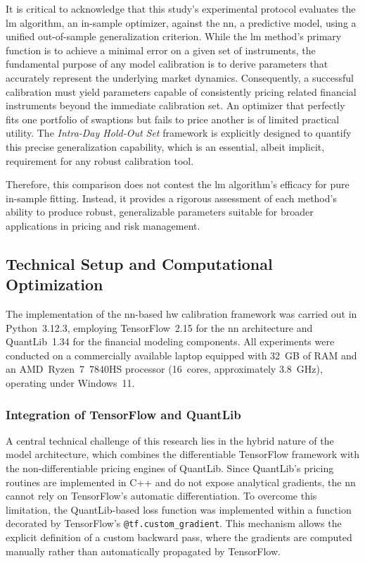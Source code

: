 It is critical to acknowledge that this study's experimental protocol evaluates the \ac{lm} algorithm, an in-sample optimizer, against the \ac{nn}, a predictive model, using a unified out-of-sample generalization criterion. While the \ac{lm} method's primary function is to achieve a minimal error on a given set of instruments, the fundamental purpose of any model calibration is to derive parameters that accurately represent the underlying market dynamics. Consequently, a successful calibration must yield parameters capable of consistently pricing related financial instruments beyond the immediate calibration set. An optimizer that perfectly fits one portfolio of swaptions but fails to price another is of limited practical utility. The \textit{Intra-Day Hold-Out Set} framework is explicitly designed to quantify this precise generalization capability, which is an essential, albeit implicit, requirement for any robust calibration tool.

Therefore, this comparison does not contest the \ac{lm} algorithm's efficacy for pure in-sample fitting. Instead, it provides a rigorous assessment of each method's ability to produce robust, generalizable parameters suitable for broader applications in pricing and risk management.

\subsection{Technical Setup and Computational Optimization}
\label{subsec:technical_setup}
The implementation of the \ac{nn}-based \ac{hw} calibration framework was carried out in Python~3.12.3, employing TensorFlow~2.15 for the \ac{nn} architecture and QuantLib~1.34 for the financial modeling components. All experiments were conducted on a commercially available laptop equipped with 32~GB of RAM and an AMD~Ryzen~7~7840HS processor (16~cores, approximately 3.8~GHz), operating under Windows~11.

\subsubsection{Integration of TensorFlow and QuantLib}
A central technical challenge of this research lies in the hybrid nature of the model architecture, which combines the differentiable TensorFlow framework with the non-differentiable pricing engines of QuantLib. Since QuantLib's pricing routines are implemented in C++ and do not expose analytical gradients, the \ac{nn} cannot rely on TensorFlow's automatic differentiation. To overcome this limitation, the QuantLib-based loss function was implemented within a function decorated by TensorFlow's \texttt{@tf.custom\_gradient}. This mechanism allows the explicit definition of a custom backward pass, where the gradients are computed manually rather than automatically propagated by TensorFlow.

